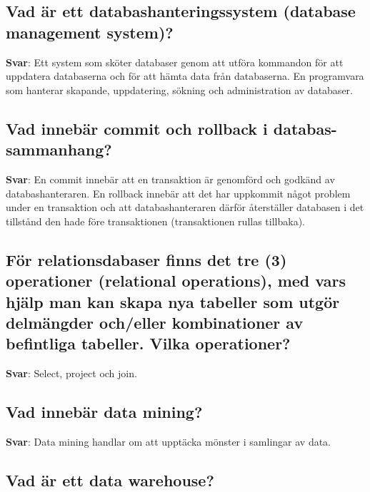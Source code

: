 \documentclass[a4paper,11pt,oneside]{article}
\begin{document}
\begin{sloppypar}
\subsection{Vad \"ar ett databashanteringssystem (database management system)?}

\label{q:277:sa:sv:True}

\textbf{Svar}: Ett system som sk\"oter databaser genom att utf\"ora kommandon f\"or att uppdatera databaserna och f\"or att h\"amta data fr\r{a}n databaserna. En programvara som hanterar skapande, uppdatering, s\"okning och administration av databaser.



\subsection{Vad inneb\"ar commit och rollback i databas-sammanhang?}

\label{q:278:sa:sv:True}

\textbf{Svar}: En commit inneb\"ar att en transaktion \"ar genomf\"ord och godk\"and av databashanteraren. En rollback inneb\"ar att det har uppkommit n\r{a}got problem under en transaktion och att databashanteraren d\"arf\"or \r{a}terst\"aller databasen i det tillst\r{a}nd den hade f\"ore transaktionen (transaktionen rullas tillbaka).



\subsection{F\"or relationsdabaser finns det tre (3) operationer (relational operations), med vars hj\"alp man kan skapa nya tabeller som utg\"or delm\"angder och/eller kombinationer av befintliga tabeller. Vilka operationer?}

\label{q:279:sa:sv:True}

\textbf{Svar}: Select, project och join.



\subsection{Vad inneb\"ar data mining?}

\label{q:280:sa:sv:True}

\textbf{Svar}: Data mining handlar om att uppt\"acka m\"onster i samlingar av data.



\subsection{Vad \"ar ett data warehouse?}


\end{sloppypar}
\end{document}

